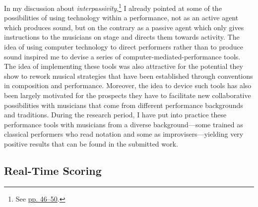 In my discussion about \emph{interpassivity},\footnote{See \hyperlink{interpassiv}{pp. 46--50}.} I already pointed at some of the possibilities of using technology within a performance, not as an active agent which produces sound, but on the contrary as a passive agent which only gives instructions to the musicians on stage and directs them towards activity. The idea of using computer technology to direct performers rather than to produce sound inspired me to devise a series of computer-mediated-performance tools. The idea of implementing these tools was also attractive for the potential they show to rework musical strategies that have been established through conventions in composition and performance. Moreover, the idea to device such tools has also been largely motivated for the prospects they have to facilitate new collaborative possibilities with musicians that come from different performance backgrounds and traditions. During the research period, I have put into practice these performance tools with musicians from a diverse background---some trained as classical performers who read notation and some as improvisers---yielding very positive results that can be found in the submitted work.

\subsection{Real-Time Scoring}

